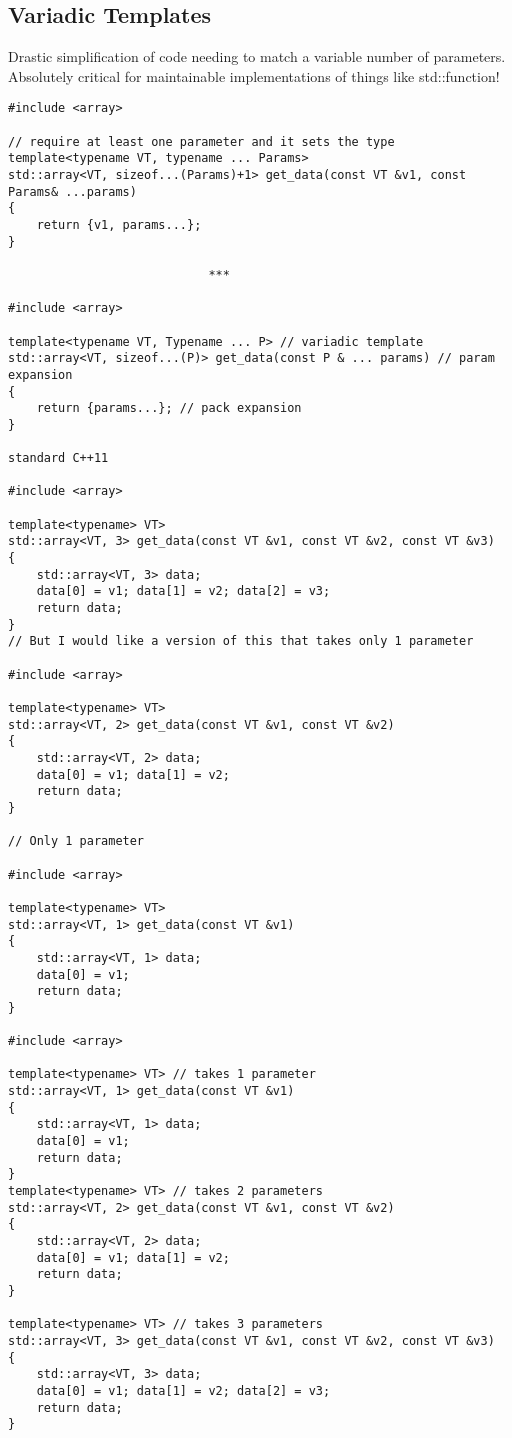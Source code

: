 \documentclass[openany]{report}
\begin{document}
\subsection{Variadic Templates}

Drastic simplification of code needing to match a variable number of parameters.
Absolutely critical for maintainable implementations of things like std::function!

\begin{verbatim}
#include <array>

// require at least one parameter and it sets the type
template<typename VT, typename ... Params>
std::array<VT, sizeof...(Params)+1> get_data(const VT &v1, const Params& ...params)
{
    return {v1, params...};
}

                            ***

#include <array>

template<typename VT, Typename ... P> // variadic template
std::array<VT, sizeof...(P)> get_data(const P & ... params) // param expansion
{
    return {params...}; // pack expansion
}

standard C++11

#include <array>

template<typename> VT>
std::array<VT, 3> get_data(const VT &v1, const VT &v2, const VT &v3)
{
    std::array<VT, 3> data;
    data[0] = v1; data[1] = v2; data[2] = v3;
    return data;
}
// But I would like a version of this that takes only 1 parameter

#include <array>

template<typename> VT>
std::array<VT, 2> get_data(const VT &v1, const VT &v2)
{
    std::array<VT, 2> data;
    data[0] = v1; data[1] = v2;
    return data;
}

// Only 1 parameter

#include <array>

template<typename> VT>
std::array<VT, 1> get_data(const VT &v1)
{
    std::array<VT, 1> data;
    data[0] = v1;
    return data;
}

#include <array>

template<typename> VT> // takes 1 parameter
std::array<VT, 1> get_data(const VT &v1)
{
    std::array<VT, 1> data;
    data[0] = v1;
    return data;
}
template<typename> VT> // takes 2 parameters
std::array<VT, 2> get_data(const VT &v1, const VT &v2)
{
    std::array<VT, 2> data;
    data[0] = v1; data[1] = v2;
    return data;
}

template<typename> VT> // takes 3 parameters
std::array<VT, 3> get_data(const VT &v1, const VT &v2, const VT &v3)
{
    std::array<VT, 3> data;
    data[0] = v1; data[1] = v2; data[2] = v3;
    return data;
}


\end{verbatim}
\end{document}
